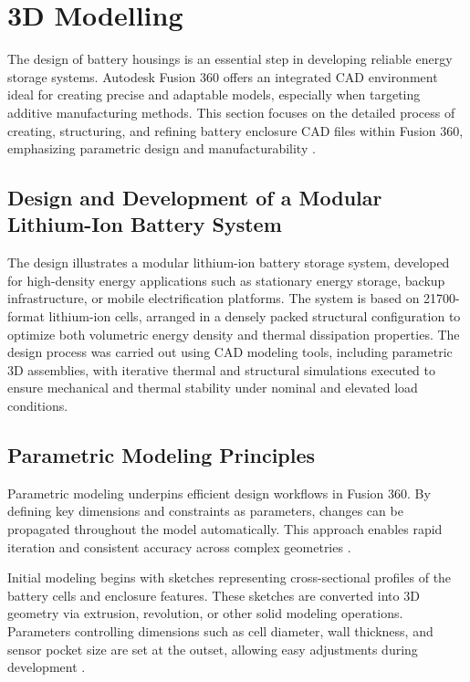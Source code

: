 \chapter{3D Modelling}
The design of battery housings is an essential step in developing reliable energy storage systems. Autodesk Fusion 360 offers an integrated CAD environment ideal for creating precise and adaptable models, especially when targeting additive manufacturing methods. This section focuses on the detailed process of creating, structuring, and refining battery enclosure CAD files within Fusion 360, emphasizing parametric design and manufacturability \cite{hogan2025}.
\section{Design and Development of a Modular Lithium-Ion Battery System}

The design illustrates a modular lithium-ion battery storage system, developed for high-density energy applications such as stationary energy storage, backup infrastructure, or mobile electrification platforms. The system is based on 21700-format lithium-ion cells, arranged in a densely packed structural configuration to optimize both volumetric energy density and thermal dissipation properties. The design process was carried out using CAD modeling tools, including parametric 3D assemblies, with iterative thermal and structural simulations executed to ensure mechanical and thermal stability under nominal and elevated load conditions.



\section{Parametric Modeling Principles}

Parametric modeling underpins efficient design workflows in Fusion 360. By defining key dimensions and constraints as parameters, changes can be propagated throughout the model automatically. This approach enables rapid iteration and consistent accuracy across complex geometries \cite{anderson2020}.

Initial modeling begins with sketches representing cross-sectional profiles of the battery cells and enclosure features. These sketches are converted into 3D geometry via extrusion, revolution, or other solid modeling operations. Parameters controlling dimensions such as cell diameter, wall thickness, and sensor pocket size are set at the outset, allowing easy adjustments during development \cite{gebhardt2016}.

